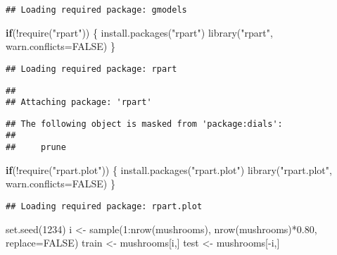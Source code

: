 \documentclass[
]{article}
\newenvironment{Shaded}{\begin{snugshade}}{\end{snugshade}}
\newcommand{\AttributeTok}[1]{\textcolor[rgb]{0.77,0.63,0.00}{#1}}
\newcommand{\ConstantTok}[1]{\textcolor[rgb]{0.00,0.00,0.00}{#1}}
\newcommand{\ControlFlowTok}[1]{\textcolor[rgb]{0.13,0.29,0.53}{\textbf{#1}}}
\newcommand{\DecValTok}[1]{\textcolor[rgb]{0.00,0.00,0.81}{#1}}
\newcommand{\FloatTok}[1]{\textcolor[rgb]{0.00,0.00,0.81}{#1}}
\newcommand{\FunctionTok}[1]{\textcolor[rgb]{0.00,0.00,0.00}{#1}}
\newcommand{\NormalTok}[1]{#1}
\newcommand{\OtherTok}[1]{\textcolor[rgb]{0.56,0.35,0.01}{#1}}
\newcommand{\SpecialCharTok}[1]{\textcolor[rgb]{0.00,0.00,0.00}{#1}}
\newcommand{\StringTok}[1]{\textcolor[rgb]{0.31,0.60,0.02}{#1}}
\begin{document}
\begin{verbatim}
## Loading required package: gmodels
\end{verbatim}

\begin{Shaded}
\begin{Highlighting}[]
\ControlFlowTok{if}\NormalTok{(}\SpecialCharTok{!}\FunctionTok{require}\NormalTok{(}\StringTok{"rpart"}\NormalTok{)) \{}
  \FunctionTok{install.packages}\NormalTok{(}\StringTok{"rpart"}\NormalTok{)}
  \FunctionTok{library}\NormalTok{(}\StringTok{"rpart"}\NormalTok{, }\AttributeTok{warn.conflicts=}\ConstantTok{FALSE}\NormalTok{)}
\NormalTok{\}}
\end{Highlighting}
\end{Shaded}

\begin{verbatim}
## Loading required package: rpart
\end{verbatim}

\begin{verbatim}
## 
## Attaching package: 'rpart'
\end{verbatim}

\begin{verbatim}
## The following object is masked from 'package:dials':
## 
##     prune
\end{verbatim}

\begin{Shaded}
\begin{Highlighting}[]
\ControlFlowTok{if}\NormalTok{(}\SpecialCharTok{!}\FunctionTok{require}\NormalTok{(}\StringTok{"rpart.plot"}\NormalTok{)) \{}
  \FunctionTok{install.packages}\NormalTok{(}\StringTok{"rpart.plot"}\NormalTok{)}
  \FunctionTok{library}\NormalTok{(}\StringTok{"rpart.plot"}\NormalTok{, }\AttributeTok{warn.conflicts=}\ConstantTok{FALSE}\NormalTok{)}
\NormalTok{\}}
\end{Highlighting}
\end{Shaded}

\begin{verbatim}
## Loading required package: rpart.plot
\end{verbatim}

\begin{Shaded}
\begin{Highlighting}[]
\FunctionTok{set.seed}\NormalTok{(}\DecValTok{1234}\NormalTok{)}
\NormalTok{i }\OtherTok{\textless{}{-}} \FunctionTok{sample}\NormalTok{(}\DecValTok{1}\SpecialCharTok{:}\FunctionTok{nrow}\NormalTok{(mushrooms), }\FunctionTok{nrow}\NormalTok{(mushrooms)}\SpecialCharTok{*}\FloatTok{0.80}\NormalTok{,}
\AttributeTok{replace=}\ConstantTok{FALSE}\NormalTok{)}
\NormalTok{train }\OtherTok{\textless{}{-}}\NormalTok{ mushrooms[i,]}
\NormalTok{test }\OtherTok{\textless{}{-}}\NormalTok{ mushrooms[}\SpecialCharTok{{-}}\NormalTok{i,]}
\end{Highlighting}
\end{Shaded}
\end{document}
